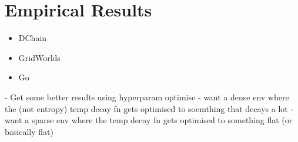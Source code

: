 


\section{Empirical Results}
\label{sec:4-4-results}

    \begin{itemize}
        \item DChain
        \item GridWorlds
        \item Go
    \end{itemize}

    - Get some better results using hyperparam optimise
    - want a dense env where the (not entropy) temp decay fn gets optimised to soemthing that decays a lot
    - want a sparse env where the temp decay fn gets optimised to something flat (or basically flat)


